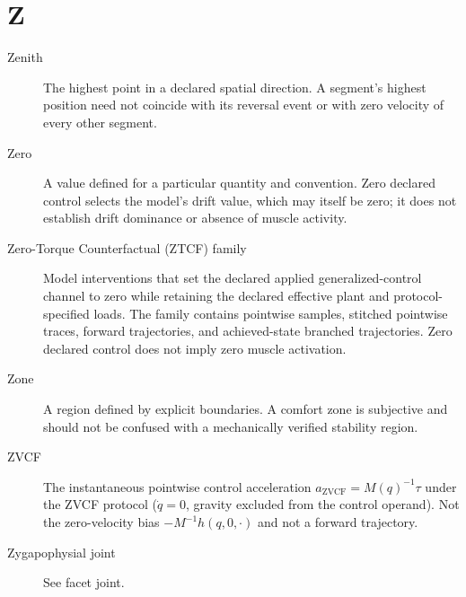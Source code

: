\section*{Z}
\begin{description}

\item[Zenith] The highest point in a declared spatial direction. A segment's highest position need not coincide with its reversal event or with zero velocity of every other segment.

\item[Zero] A value defined for a particular quantity and convention. Zero declared control selects the model's drift value, which may itself be zero; it does not establish drift dominance or absence of muscle activity.

\item[Zero-Torque Counterfactual (ZTCF) family] Model interventions that set the declared applied generalized-control channel to zero while retaining the declared effective plant and protocol-specified loads. The family contains pointwise samples, stitched pointwise traces, forward trajectories, and achieved-state branched trajectories. Zero declared control does not imply zero muscle activation.

\item[Zone] A region defined by explicit boundaries. A comfort zone is subjective and should not be confused with a mechanically verified stability region.

\item[ZVCF] The instantaneous pointwise control acceleration $a_{\mathrm{ZVCF}}=M(q)^{-1}\tau$ under the ZVCF protocol ($\dot q=0$, gravity excluded from the control operand). Not the zero-velocity bias $-M^{-1}h(q,0,\cdot)$ and not a forward trajectory.

\item[Zygapophysial joint] See facet joint.
\end{description}
\endgroup
